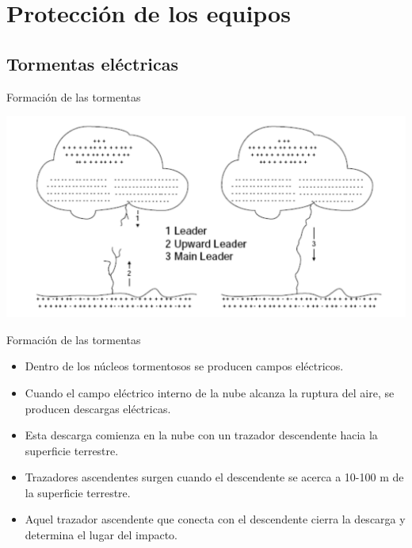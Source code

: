 \documentclass[xcolor={usenames,svgnames,dvipsnames}]{beamer}
\begin{document}
\section{Protección de los equipos}
\label{sec:org98e3469}

\subsection{Tormentas eléctricas}
\label{sec:org2a44c15}

\begin{frame}[label={sec:org1792fe8}]{Formación de las tormentas}
\begin{center}
\includegraphics[width=.9\linewidth]{../figs/FormacionTormenta.pdf}
\end{center}
\end{frame}

\begin{frame}[label={sec:orgabfbb99}]{Formación de las tormentas}
\begin{itemize}
\item Dentro de los núcleos tormentosos se producen campos eléctricos.

\item Cuando el campo eléctrico interno de la nube alcanza la ruptura del
aire, se producen descargas eléctricas.

\item \alert{Esta descarga comienza en la nube} con un \alert{trazador descendente} hacia
la superficie terrestre.

\item Trazadores ascendentes surgen cuando el descendente se acerca a
10-100 m de la superficie terrestre.

\item Aquel trazador ascendente que conecta con el descendente cierra la
descarga y determina el lugar del impacto.
\end{itemize}
\end{frame}
\end{document}
